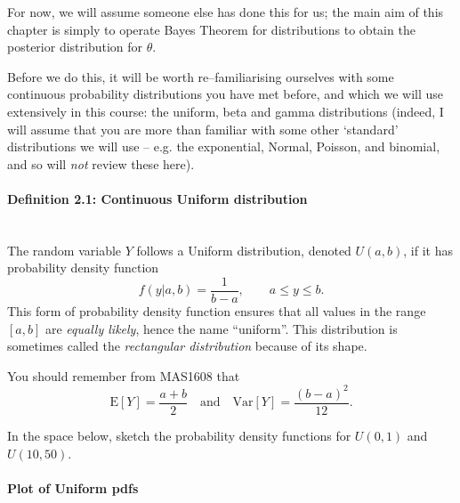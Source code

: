 For now, we will assume someone else has done this for us; the main aim of this chapter is simply to operate Bayes Theorem for distributions to obtain the posterior distribution for $\theta$.  

Before we do this, it will be worth re--familiarising ourselves with some continuous probability distributions you have met before, and which we will use extensively in this course: the uniform, beta and gamma distributions (indeed, I will assume that you are more than familiar with some other `standard' distributions we will use -- e.g. the exponential, Normal, Poisson, and binomial, and so will \textit{not} review these here).  

\paragraph{Definition 2.1: Continuous Uniform distribution}{~\\
The random variable $Y$ follows a Uniform distribution, denoted $U(a,b)$, if it has probability density function
$$
f(y|a,b) = \frac{1}{b-a}, \quad \quad a\leq y \leq b.
$$
This form of probability density function ensures that all values in the range $[a,b]$ are \textit{equally likely}, hence the name ``uniform''.  This distribution is sometimes called the \textit{rectangular distribution} because of its shape.  

You should remember from MAS1608 that 
$$
\text{E}[Y] = \frac{a+b}{2} \quad \text{and} \quad \text{Var}[Y] = \frac{(b-a)^{2}}{12}.
$$}
In the space below, sketch the probability density functions for $U(0,1)$ and $U(10,50)$. 

\paragraph{Plot of Uniform pdfs}{
    
}

